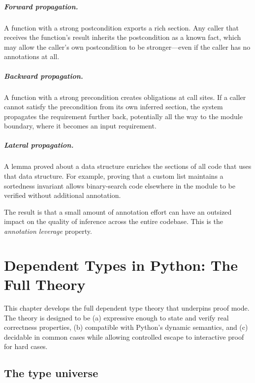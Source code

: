 \documentclass[11pt]{report}
\theoremstyle{definition}
\theoremstyle{plain}
\begin{document}
\paragraph{Forward propagation.}
A function with a strong postcondition exports a rich section. Any caller
that receives the function's result inherits the postcondition as a known
fact, which may allow the caller's own postcondition to be stronger---even
if the caller has no annotations at all.

\paragraph{Backward propagation.}
A function with a strong precondition creates obligations at call sites. If
a caller cannot satisfy the precondition from its own inferred section, the
system propagates the requirement further back, potentially all the way to
the module boundary, where it becomes an input requirement.

\paragraph{Lateral propagation.}
A lemma proved about a data structure enriches the sections of all code that
uses that data structure. For example, proving that a custom list maintains
a sortedness invariant allows binary-search code elsewhere in the module to
be verified without additional annotation.

The result is that a small amount of annotation effort can have an outsized
impact on the quality of inference across the entire codebase. This is the
\emph{annotation leverage} property.


\chapter{Dependent Types in Python: The Full Theory}

This chapter develops the full dependent type theory that underpins proof
mode. The theory is designed to be (a) expressive enough to state and verify
real correctness properties, (b) compatible with Python's dynamic semantics,
and (c) decidable in common cases while allowing controlled escape to
interactive proof for hard cases.

\section{The type universe}
\end{document}
